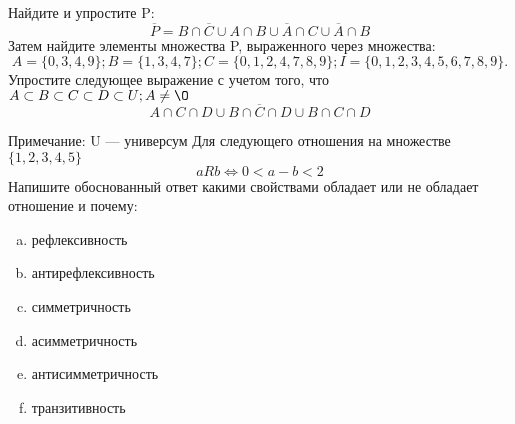 \documentclass[10pt]{exam}
\begin{document}
\begin{questions}
\question
Найдите и упростите P:
\begin{equation*}
\overline{P} = B \cap \overline{C} \cup A \cap B \cup \overline{A} \cap C \cup \overline{A} \cap B
\end{equation*}
Затем найдите элементы множества P, выраженного через множества:
\begin{equation*}
A = \{0, 3, 4, 9\}; 
B = \{1, 3, 4, 7\};
C = \{0, 1, 2, 4, 7, 8, 9\};
I = \{0, 1, 2, 3, 4, 5, 6, 7, 8, 9\}.
\end{equation*}\question
Упростите следующее выражение с учетом того, что $A\subset B \subset C \subset D \subset U; A \neq \O$
\begin{equation*}
A \cap C  \cap D \cup B \cap \overline{C} \cap D \cup B \cap C \cap D
\end{equation*}

Примечание: U — универсум\question
Для следующего отношения на множестве $\{1, 2, 3, 4, 5\}$ 
\begin{equation*}
aRb \iff 0 < a-b<2
\end{equation*}
Напишите обоснованный ответ какими свойствами обладает или не обладает отношение и почему:   
\begin{enumerate} [a)]\setcounter{enumi}{0}
\item рефлексивность
\item антирефлексивность
\item симметричность
\item асимметричность
\item антисимметричность
\item транзитивность
\end{enumerate}


\end{questions}
\end{document}

